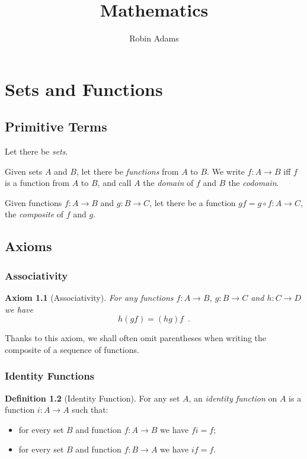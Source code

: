 \documentclass{book}
\title{Mathematics}
\author{Robin Adams}
\newtheorem{ax}{Axiom}[chapter]
\theoremstyle{definition}
\newtheorem{df}[ax]{Definition}
\begin{document}
\maketitle
\tableofcontents

\chapter{Sets and Functions}

\section{Primitive Terms}

Let there be \emph{sets}.

Given sets $A$ and $B$, let there be \emph{functions} from $A$ to $B$. We write $f : A \rightarrow B$ iff $f$ is a function from $A$ to $B$, and call $A$ the \emph{domain} of $f$ and $B$ the \emph{codomain}.

Given functions $f : A \rightarrow B$ and $g : B \rightarrow C$, let there be a function $gf = g \circ f : A \rightarrow C$, the \emph{composite} of $f$ and $g$.

\section{Axioms}

\subsection{Associativity}
\begin{ax}[Associativity]
For any functions $f : A \rightarrow B$, $g : B \rightarrow C$ and $h : C \rightarrow D$ we have
\[ h (gf) = (hg) f \enspace . \]
\end{ax}

Thanks to this axiom, we shall often omit parentheses when writing the composite of a sequence of functions.

\subsection{Identity Functions}

\begin{df}[Identity Function]
For any set $A$, an \emph{identity function} on $A$ is a function $i : A \rightarrow A$ such that:
\begin{itemize}
\item for every set $B$ and function $f : A \rightarrow B$ we have $fi = f$;
\item for every set $B$ and function $f : B \rightarrow A$ we have $if = f$.
\end{itemize}
\end{df}
\end{document}
